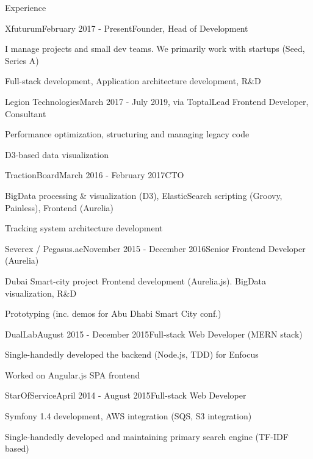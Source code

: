 \documentclass{resume} %
\begin{document}
\begin{rSection}{Experience}

\begin{rSubsection}{Xfuturum}{February 2017 - Present}{Founder, Head of Development}{}
\item I manage projects and small dev teams. We primarily work with startups (Seed, Series A)
\item Full-stack development, Application architecture development, R\&D
\end{rSubsection}

\begin{rSubsection}{Legion Technologies}{March 2017 - July 2019, via Toptal}{Lead Frontend Developer, Consultant}{}
\item Performance optimization, structuring and managing legacy code
\item D3-based data visualization
\end{rSubsection}

\begin{rSubsection}{TractionBoard}{March 2016 - February 2017}{CTO}{}
\item BigData processing \& visualization (D3), ElasticSearch scripting (Groovy, Painless), Frontend (Aurelia)
\item Tracking system architecture development
\end{rSubsection}

\begin{rSubsection}{Severex / Pegasus.ae}{November 2015 - December 2016}{Senior Frontend Developer (Aurelia)}{}
\item Dubai Smart-city project Frontend development (Aurelia.js). BigData visualization, R\&D
\item Prototyping (inc. demos for Abu Dhabi Smart City conf.)
\end{rSubsection}

\begin{rSubsection}{DualLab}{August 2015 - December 2015}{Full-stack Web Developer (MERN stack)}{}
\item Single-handedly developed the backend (Node.js, TDD) for Enfocus
\item Worked on Angular.js SPA frontend
\end{rSubsection}

\begin{rSubsection}{StarOfService}{April 2014 - August 2015}{Full-stack Web Developer}{}
\item Symfony 1.4 development, AWS integration (SQS, S3 integration)
\item Single-handedly developed and maintaining primary search engine (TF-IDF based)
\end{rSubsection}


\end{rSection}
\end{document}
